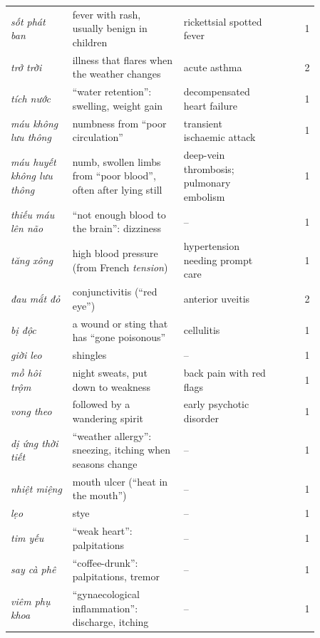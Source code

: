 \documentclass[runningheads]{llncs}
\newcommand{\vi}[1]{\textit{#1}}   %
\begin{document}
\begin{table}[h]
\begin{tabular}{p{0.2\linewidth}p{0.36\linewidth}p{0.3\linewidth}r}
\vi{sốt phát ban} & fever with rash, usually benign in children & rickettsial spotted fever & 1 \\
\vi{trở trời} & illness that flares when the weather changes & acute asthma & 2 \\
\vi{tích nước} & ``water retention'': swelling, weight gain & decompensated heart failure & 1 \\
\vi{máu không lưu thông} & numbness from ``poor circulation'' & transient ischaemic attack & 1 \\
\vi{máu huyết không lưu thông} & numb, swollen limbs from ``poor blood'', often after lying still & deep-vein thrombosis; pulmonary embolism & 1 \\
\vi{thiếu máu lên não} & ``not enough blood to the brain'': dizziness & -- & 1 \\
\vi{tăng xông} & high blood pressure (from French \emph{tension}) & hypertension needing prompt care & 1 \\
\vi{đau mắt đỏ} & conjunctivitis (``red eye'') & anterior uveitis & 2 \\
\vi{bị độc} & a wound or sting that has ``gone poisonous'' & cellulitis & 1 \\
\vi{giời leo} & shingles & -- & 1 \\
\vi{mồ hôi trộm} & night sweats, put down to weakness & back pain with red flags & 1 \\
\vi{vong theo} & followed by a wandering spirit & early psychotic disorder & 1 \\
\vi{dị ứng thời tiết} & ``weather allergy'': sneezing, itching when seasons change & -- & 1 \\
\vi{nhiệt miệng} & mouth ulcer (``heat in the mouth'') & -- & 1 \\
\vi{lẹo} & stye & -- & 1 \\
\vi{tim yếu} & ``weak heart'': palpitations & -- & 1 \\
\vi{say cà phê} & ``coffee-drunk'': palpitations, tremor & -- & 1 \\
\vi{viêm phụ khoa} & ``gynaecological inflammation'': discharge, itching & -- & 1 \\\bottomrule
\end{tabular}
\end{table}
\end{document}

